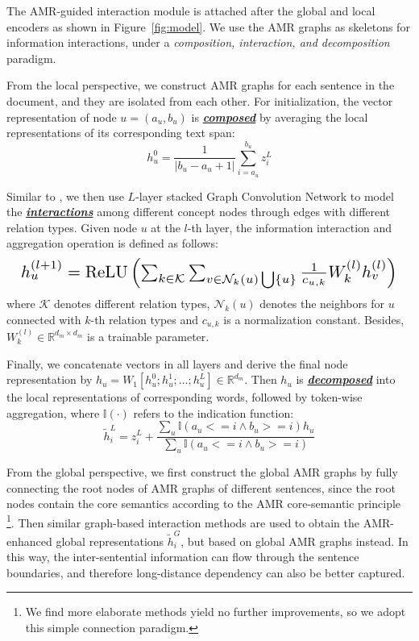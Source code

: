 The AMR-guided interaction module is attached after the global and local encoders as shown in Figure~\ref{fig:model}.
We use the AMR graphs as skeletons for information interactions, under a \textit{composition, interaction, and decomposition} paradigm.

From the local perspective, we construct AMR graphs for each sentence in the document, and they are isolated from each other.
For initialization, the vector representation of node $u=(a_u, b_u)$ is \underline{\textit{\textbf{composed}}} by averaging the local representations of its corresponding text span:
\begin{equation*}
    h^0_u = \frac{1}{\left | b_u-a_u+1 \right | } \sum_{i=a_u}^{b_u} z^L_i
\end{equation*}

Similar to \citet{zeng-etal-2020-double}, we then use $L$-layer stacked Graph Convolution Network \citep{kipf2017semi} to model the \underline{\textit{\textbf{interactions}}} among different concept nodes through edges with different relation types.
Given node $u$ at the $l$-th layer, the information interaction and aggregation operation is defined as follows:
\begin{equation*}
\resizebox{\linewidth}{!}{ $
       h_{u}^{(l + 1)} = \mathrm{ReLU} \left(\sum_{k\in\mathcal{K}}\sum_{v\in\mathcal{N}_k(u) \bigcup \{u\}} \frac{1}{c_{u,k}} W^{(l)}_k h_{v}^{(l)} \right)
$
}
\end{equation*}
where $\mathcal{K}$ denotes different relation types, $\mathcal{N}_k(u)$ denotes the neighbors for $u$ connected with $k$-th relation types and $c_{u,k}$ is a normalization constant.
Besides, $W^{(l)}_k\in \mathbb{R}^{d_m \times d_m}$ is a trainable parameter.

Finally, we concatenate vectors in all layers and derive the final node representation by $h_u= W_1[h_{u}^{0}; h_{u}^{1}; \ldots; h_{u}^{L}] \in \mathbb{R}^{d_{m}}$.
Then $h_u$ is  \underline{\textit{\textbf{decomposed}}} into the local representations of corresponding words, followed by token-wise aggregation, where $\mathbb{I}(\cdot)$ refers to the indication function:
\begin{equation*}
    \widetilde{h}^L_i = z^L_i + \frac{\sum_{u} \mathbb{I}(a_u<=i \wedge b_u>=i)h_u}{\sum_{u}\mathbb{I}(a_u<=i \wedge b_u>=i)} 
\end{equation*}

From the global perspective, we first construct the global AMR graphs by fully connecting the root nodes of AMR graphs of different sentences, since the root nodes contain the core semantics according to the AMR core-semantic principle~\citep{cai-lam-2019-core}
\footnote{We find more elaborate methods yield no further improvements, so we adopt this simple connection paradigm.}.
Then similar graph-based interaction methods are used to obtain the AMR-enhanced global representations $\widetilde{h}^G_i$, but based on global AMR graphs instead.
In this way, the inter-sentential information can flow through the sentence boundaries, and therefore long-distance dependency can also be better captured.

